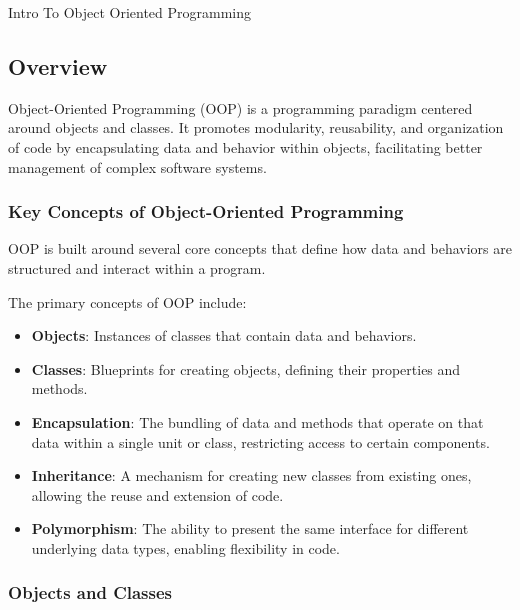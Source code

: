 \begin{notes}{Intro To Object Oriented Programming}
    \subsection*{Overview}

    Object-Oriented Programming (OOP) is a programming paradigm centered around objects and classes. It promotes modularity, reusability, and organization of code by encapsulating data and behavior within objects, facilitating better management of complex software systems.
    
    \subsubsection*{Key Concepts of Object-Oriented Programming}
    
    OOP is built around several core concepts that define how data and behaviors are structured and interact within a program.
    
    \begin{highlight}
    
        The primary concepts of OOP include:
    
        \begin{itemize}
            \item \textbf{Objects}: Instances of classes that contain data and behaviors.
            \item \textbf{Classes}: Blueprints for creating objects, defining their properties and methods.
            \item \textbf{Encapsulation}: The bundling of data and methods that operate on that data within a single unit or class, restricting access to certain components.
            \item \textbf{Inheritance}: A mechanism for creating new classes from existing ones, allowing the reuse and extension of code.
            \item \textbf{Polymorphism}: The ability to present the same interface for different underlying data types, enabling flexibility in code.
        \end{itemize}
    
    \end{highlight}
    
    \subsubsection*{Objects and Classes}
    

\end{notes}
